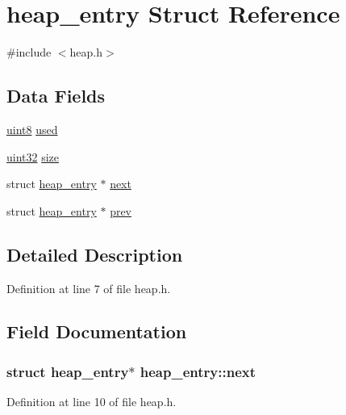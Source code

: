 \hypertarget{structheap__entry}{
\section{heap\_\-entry Struct Reference}
\label{structheap__entry}
}


{\ttfamily \#include $<$heap.h$>$}

\subsection*{Data Fields}
\begin{DoxyCompactItemize}
\item 
\hyperlink{int__types_8h_adde6aaee8457bee49c2a92621fe22b79}{uint8} \hyperlink{structheap__entry_ac671a08602b18399f8b21ebacc46fe6a}{used}
\item 
\hyperlink{int__types_8h_a1134b580f8da4de94ca6b1de4d37975e}{uint32} \hyperlink{structheap__entry_a9133349c98d74429e7e8441d88e08cd6}{size}
\item 
struct \hyperlink{structheap__entry}{heap\_\-entry} $\ast$ \hyperlink{structheap__entry_a5eb7bbd3aeb64622bb4bb843d44c9b06}{next}
\item 
struct \hyperlink{structheap__entry}{heap\_\-entry} $\ast$ \hyperlink{structheap__entry_a9fbde1b1963b161058f5e1319a166672}{prev}
\end{DoxyCompactItemize}


\subsection{Detailed Description}


Definition at line 7 of file heap.h.



\subsection{Field Documentation}
\hypertarget{structheap__entry_a5eb7bbd3aeb64622bb4bb843d44c9b06}{
\subsubsection[{next}]{\setlength{\rightskip}{0pt plus 5cm}struct {\bf heap\_\-entry}$\ast$ {\bf heap\_\-entry::next}}}
\label{structheap__entry_a5eb7bbd3aeb64622bb4bb843d44c9b06}


Definition at line 10 of file heap.h.

